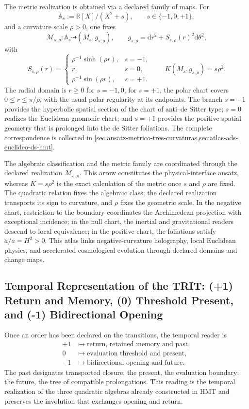 The metric realization is obtained via a declared family of maps.
For
\[
 \mathbb A_s:=\mathbb R[X]/(X^2+s),
 \qquad s\in\{-1,0,+1\},
\]
and a curvature scale \(\rho>0\), one fixes
\[
 \mathcal M_{s,\rho}:\mathbb A_s\dashrightarrow
 (M_s,g_{s,\rho}),
 \qquad
 g_{s,\rho}=\mathrm d r^2+S_{s,\rho}(r)^2\mathrm d\theta^2,
\]
with
\[
 S_{s,\rho}(r)=
 \begin{cases}
  \rho^{-1}\sinh(\rho r),&s=-1,\\
  r,&s=0,\\
  \rho^{-1}\sin(\rho r),&s=+1.
 \end{cases}
 \qquad
 K(M_s,g_{s,\rho})=s\rho^2.
\]
The radial domain is \(r\geq0\) for \(s=-1,0\); for \(s=+1\), the polar chart covers \(0\leq r\leq\pi/\rho\), with the usual polar regularity at its endpoints. The branch \(s=-1\) provides the hyperbolic spatial section of the chart of anti--de Sitter type; \(s=0\) realizes the Euclidean gnomonic chart; and \(s=+1\) provides the positive spatial geometry that is prolonged into the de Sitter foliations. The complete correspondence is collected in \cref{sec:ansatz-metrico-tres-curvaturas,sec:atlas-ads-euclideo-ds-hmt}.

The algebraic classification and the metric family are coordinated through
the declared realization \(\mathcal M_{s,\rho}\). This arrow constitutes the
physical-interface ansatz, whereas
\(K=s\rho^2\) is the exact calculation of the metric once \(s\) and
\(\rho\) are fixed. The quadratic relation fixes the algebraic class; the declared
realization transports its sign to curvature, and \(\rho\) fixes the geometric
scale. In the negative chart, restriction to the boundary coordinates the
Archimedean projection with exceptional incidence; in the null chart, the
inertial and gravitational readers descend to local equivalence; in the
positive chart, the foliations satisfy \(\ddot a/a=H^2>0\). This atlas
links negative-curvature holography, local Euclidean physics, and
accelerated cosmological evolution through declared domains and change
maps.

\subsection{Temporal Representation of the TRIT: (+1) Return and Memory, (0) Threshold Present, and (-1) Bidirectional Opening}

Once an order has been declared on the transitions, the temporal reader is
\[
\begin{aligned}
 +1&\longmapsto\text{return, retained memory and past},\\
 0&\longmapsto\text{evaluation threshold and present},\\
 -1&\longmapsto\text{bidirectional opening and future}.
\end{aligned}
\]
The past designates transported closure; the present, the evaluation
boundary; the future, the tree of compatible prolongations. This reading
is the temporal realization of the three quadratic algebras already constructed
in HMT and preserves the involution that exchanges opening and return.

